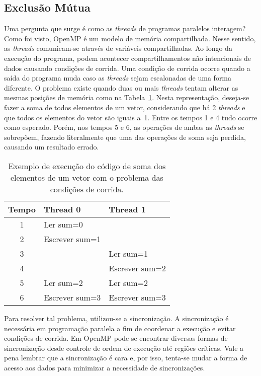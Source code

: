 \subsection{Exclusão Mútua}
\label{sec:omp:sync}

Uma pergunta que surge é como as \textit{threads} de programas paralelos interagem? Como foi visto, OpenMP é um modelo de memória compartilhada. Nesse sentido, as \textit{threads} comunicam-se através de variáveis compartilhadas. Ao longo da execução do programa, podem acontecer compartilhamentos não intencionais de dados causando condições de corrida. 
Uma condição de corrida ocorre quando a saída do programa muda caso as \textit{threads} sejam escalonadas de uma forma diferente. O problema existe quando duas ou mais \textit{threads} tentam alterar as mesmas posições de memória como na Tabela~\ref{tb:openmp:sum:race}. Nesta representação, deseja-se fazer a soma de todos elementos de um vetor, considerando que há 2 \textit{threads} e que todos os elementos do vetor são iguais a~1. Entre os tempos 1 e 4 tudo ocorre como esperado. Porém, nos tempos 5 e 6, as operações de ambas as \textit{threads} se sobrepõem, fazendo literalmente que uma das operações de soma seja perdida, causando um resultado errado.

\begin{table}[!htb]
\centering
\caption{Exemplo de execução do código de soma dos elementos de um vetor com o problema das condições de corrida.}
\label{tb:openmp:sum:race}
\begin{tabular}{@{}cll@{}}
  \toprule
  Tempo & Thread 0            & Thread 1         \\
  \midrule
  1    & Ler sum=0           &                  \\
  \midrule
  2    & Escrever sum=1      &                  \\
  \midrule
  3    &                     & Ler sum=1        \\
  \midrule
  4    &                     & Escrever sum=2   \\
  \midrule
  5    & Ler sum=2           & Ler sum=2        \\
  \midrule
  6    & Escrever sum=3      & Escrever sum=3   \\
  \bottomrule
\end{tabular}
\end{table}

Para resolver tal problema, utilizou-se a sincronização. A sincronização é necessária em programação paralela a fim de coordenar a execução e evitar condições de corrida. Em OpenMP pode-se encontrar diversas formas de sincronização desde controle de ordem de execução até regiões críticas. Vale a pena lembrar que a sincronização é cara e, por isso, tenta-se mudar a forma de acesso aos dados para minimizar a necessidade de sincronizações.

